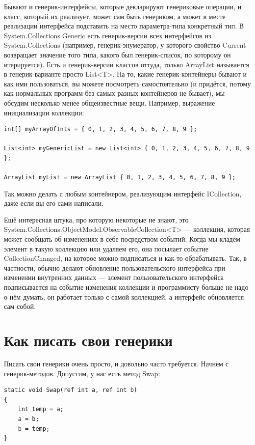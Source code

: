 \documentclass[a5paper]{article}
\begin{document}
Бывают и генерик-интерфейсы, которые декларируют генериковые операции, и класс, который их реализует, может сам быть генериком, а может в месте реализации интерфейса подставить на место параметра-типа конкретный тип. В System.Collections.Generic есть генерик-версии всех интерфейсов из System.Collections (например, генерик-энумератор, у которого свойство Current возвращает значение того типа, какого был генерик-список, по которому он итерируется). Есть и генерик-версии классов оттуда, только ArrayList называется в генерик-варианте просто List<T>. На то, какие генерик-контейнеры бывают и как ими пользоваться, вы можете посмотреть самостоятельно (и придётся, потому как нормальных программ без самых разных контейнеров не бывает), мы обсудим несколько менее общеизвестные вещи. Например, выражение инициализации коллекции:

\begin{verbatim}
int[] myArrayOfInts = { 0, 1, 2, 3, 4, 5, 6, 7, 8, 9 };

List<int> myGenericList = new List<int> { 0, 1, 2, 3, 4, 5, 6, 7, 8, 9 };

ArrayList myList = new ArrayList { 0, 1, 2, 3, 4, 5, 6, 7, 8, 9 };
\end{verbatim}

Так можно делать с любым контейнером, реализующим интерфейс ICollection, даже если вы его сами написали.

Ещё интересная штука, про которую некоторые не знают, это System.Collections.ObjectModel.ObservableCollection<T> --- коллекция, которая может сообщать об изменениях в себе посредством событий. Когда мы кладём элемент в такую коллекцию или удаляем его, она посылает событие CollectionChanged, на которое можно подписаться и как-то обрабатывать. Так, в частности, обычно делают обновление пользовательского интерфейса при изменении внутренних данных --- элемент пользовательского интерфейса подписывается на событие изменения коллекции и программисту больше не надо о нём думать, он работает только с самой коллекцией, а интерфейс обновляется сам собой.

\section{Как писать свои генерики}

Писать свои генерики очень просто, и довольно часто требуется. Начнём с генерик-методов. Допустим, у нас есть метод Swap:

\begin{verbatim}
static void Swap(ref int a, ref int b)
{
    int temp = a;
    a = b;
    b = temp;
}
\end{verbatim}
\end{document}
